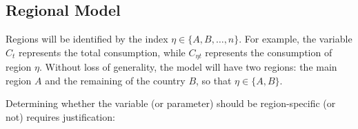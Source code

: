\documentclass[
	12pt, 
	]{article}
\numberwithin{equation}{section}
\theoremstyle{definition}
\theoremstyle{plain}
\theoremstyle{plain}
\theoremstyle{plain}
\begin{document}

\subsection{Regional Model}


Regions will be identified by the index $\eta \in \{A,B,\ldots,n\}$. For example, the variable $C_t$ represents the total consumption, while $C_{\eta t}$ represents the consumption of region $\eta$. Without loss of generality, the model will have two regions: the main region $A$ and the remaining of the country $B$, so that $\eta \in \{A,B\}$.

Determining whether the variable (or parameter) should be region-specific (or not) requires justification:


\end{document}
